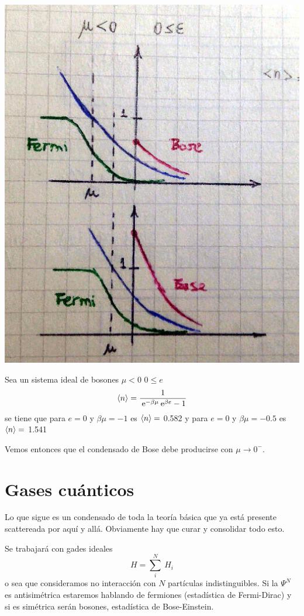 \documentclass[10pt,oneside]{CBFT_book}
\begin{document}
\includegraphics[scale=0.35]{images/1625623872.jpg}

Sea un sistema ideal de bosones $ \mu < 0 $ $ 0 \leq e $
\[
	\braket{n} = \frac{1}{ \:\mathrm{e}^{-\beta\mu} \:\mathrm{e}^{\beta e} - 1 }
\]
se tiene que para $ e=0 $ y $ \beta\mu = -1 $ es $ \braket{n} = $ 0.582 y para $ e=0 $ y $ \beta\mu = -0.5 $
es $ \braket{n} = $ 1.541

Vemos entonces que el condensado de Bose debe producirse con $ \mu \to 0^{-}$.

\section{Gases cuánticos}

Lo que sigue es un condensado de toda la teoría básica que ya está presente scattereada por aquí y allá.
Obviamente hay que curar y consolidar todo esto.

Se trabajará con gades ideales
\[
	H = \sum_i^N \: H_i
\]
o sea que consideramos no interacción con $N$ partículas indistinguibles. Si la $\Psi^N$ es antisimétrica
estaremos hablando de fermiones (estadística de Fermi-Dirac) y si es simétrica serán bosones, estadística
de Bose-Einstein.
\end{document}
